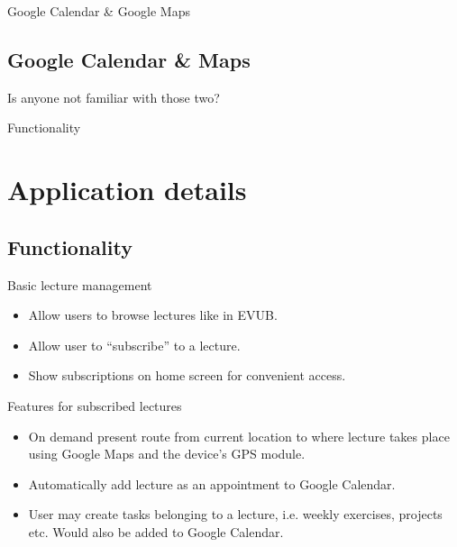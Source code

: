 \documentclass{beamer}
\begin{document}
\begin{frame}{Google Calendar \& Google Maps}
	\subsection{Google Calendar \& Maps}
	Is anyone not familiar with those two?
\end{frame}

\begin{frame}{Functionality}
	\section{Application details}
	\subsection{Functionality}
	\begin{block}{Basic lecture management}
	\begin{itemize}
		\item Allow users to browse lectures like in EVUB.
		\item Allow user to ``subscribe'' to a lecture.
		\item Show subscriptions on home screen for convenient access.
	\end{itemize}
	\end{block}

	\begin{block}{Features for subscribed lectures}
	\begin{itemize}
		\item On demand present route from current location to where lecture takes place using Google Maps and the device's GPS module.
		\item Automatically add lecture as an appointment to Google Calendar.
		\item User may create tasks belonging to a lecture, i.e. weekly exercises, projects etc. Would also be added to Google Calendar.
	\end{itemize}
	\end{block}
\end{frame}
\end{document}
